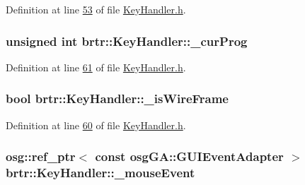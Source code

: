 Definition at line \hyperlink{_key_handler_8h_source_l00053}{53} of file \hyperlink{_key_handler_8h_source}{Key\+Handler.\+h}.

\hypertarget{classbrtr_1_1_key_handler_a578b374029e318a509983a01253a7736}{
\subsubsection[{\+\_\+cur\+Prog}]{\setlength{\rightskip}{0pt plus 5cm}unsigned int brtr\+::\+Key\+Handler\+::\+\_\+cur\+Prog\hspace{0.3cm}{\ttfamily [private]}}}\label{classbrtr_1_1_key_handler_a578b374029e318a509983a01253a7736}


Definition at line \hyperlink{_key_handler_8h_source_l00061}{61} of file \hyperlink{_key_handler_8h_source}{Key\+Handler.\+h}.

\hypertarget{classbrtr_1_1_key_handler_a6939e2c5e93e53d6090c999eae2fb927}{
\subsubsection[{\+\_\+is\+Wire\+Frame}]{\setlength{\rightskip}{0pt plus 5cm}bool brtr\+::\+Key\+Handler\+::\+\_\+is\+Wire\+Frame\hspace{0.3cm}{\ttfamily [private]}}}\label{classbrtr_1_1_key_handler_a6939e2c5e93e53d6090c999eae2fb927}


Definition at line \hyperlink{_key_handler_8h_source_l00060}{60} of file \hyperlink{_key_handler_8h_source}{Key\+Handler.\+h}.

\hypertarget{classbrtr_1_1_key_handler_a1b2404dcd19426a93d4474cd45da84e8}{
\subsubsection[{\+\_\+mouse\+Event}]{\setlength{\rightskip}{0pt plus 5cm}osg\+::ref\+\_\+ptr$<$ const osg\+G\+A\+::\+G\+U\+I\+Event\+Adapter $>$ brtr\+::\+Key\+Handler\+::\+\_\+mouse\+Event\hspace{0.3cm}{\ttfamily [private]}}}\label{classbrtr_1_1_key_handler_a1b2404dcd19426a93d4474cd45da84e8}


